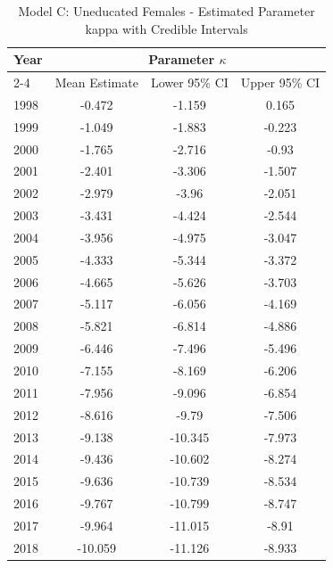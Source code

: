 \begin{landscape}
\begin{table}[htbp]
\centering
\caption{Model C: Uneducated Females - Estimated Parameter kappa  with Credible Intervals}
\label{tab:parameters_k17}
\begin{tabular}{@{}lccc@{}}
\toprule
Year & \multicolumn{3}{c}{Parameter \(\kappa\)} \\
\cmidrule(lr){2-4}
      & Mean Estimate & Lower 95\% CI & Upper 95\% CI \\
\midrule
1998 & -0.472 & -1.159 & 0.165 \\
1999 & -1.049 & -1.883 & -0.223 \\
2000 & -1.765 & -2.716 & -0.93 \\
2001 & -2.401 & -3.306 & -1.507 \\
2002 & -2.979 & -3.96 & -2.051 \\
2003 & -3.431 & -4.424 & -2.544 \\
2004 & -3.956 & -4.975 & -3.047 \\
2005 & -4.333 & -5.344 & -3.372 \\
2006 & -4.665 & -5.626 & -3.703 \\
2007 & -5.117 & -6.056 & -4.169 \\
2008 & -5.821 & -6.814 & -4.886 \\
2009 & -6.446 & -7.496 & -5.496 \\
2010 & -7.155 & -8.169 & -6.206 \\
2011 & -7.956 & -9.096 & -6.854 \\
2012 & -8.616 & -9.79 & -7.506 \\
2013 & -9.138 & -10.345 & -7.973 \\
2014 & -9.436 & -10.602 & -8.274 \\
2015 & -9.636 & -10.739 & -8.534 \\
2016 & -9.767 & -10.799 & -8.747 \\
2017 & -9.964 & -11.015 & -8.91 \\
2018 & -10.059 & -11.126 & -8.933 \\
\bottomrule
\end{tabular}
\end{table}
\end{landscape}